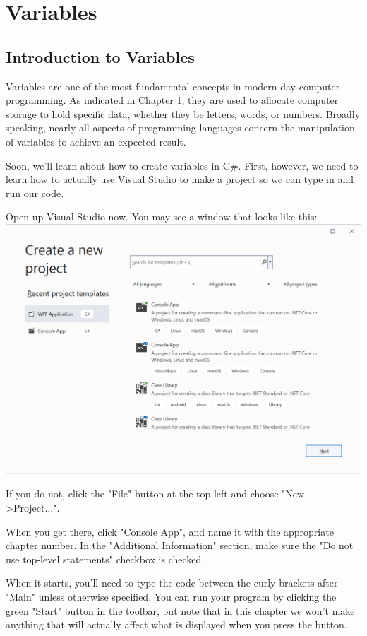 \documentclass[oneside, openany] {book}
\begin{document}
\chapter{Variables}
\minitoc
\textbf{}
\section{Introduction to Variables}
Variables are one of the most fundamental concepts in modern-day computer programming. As indicated in Chapter 1, they are used to allocate computer storage to hold specific data, whether they be letters, words, or numbers. Broadly speaking, nearly all aspects of programming languages concern the manipulation of variables to achieve an expected result.

Soon, we'll learn about how to create variables in C\#. First, however, we need to learn how to actually use Visual Studio to make a project so we can type in and run our code.

Open up Visual Studio now. You may see a window that looks like this:
\includegraphics[scale=0.5]{CreateProject}

If you do not, click the "File" button at the top-left and choose "New->Project...".

When you get there, click "Console App", and name it with the appropriate chapter number. In the "Additional Information" section, make sure the "Do not use top-level statements" checkbox is checked.

When it starts, you'll need to type the code between the curly brackets after "Main" unless otherwise specified. You can run your program by clicking the green "Start" button in the toolbar, but note that in this chapter we won't make anything that will actually affect what is displayed when you press the button.
\end{document}

